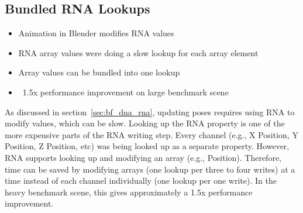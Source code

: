 \subsection{Bundled RNA Lookups}
\ifsummaries
\begin{itemize}
 \item Animation in Blender modifies RNA values
 \item RNA array values were doing a slow lookup for each array element
 \item Array values can be bundled into one lookup
 \item ~1.5x performance improvement on large benchmark scene
\end{itemize}
\fi

As discussed in section~\ref{sec:bf_dna_rna}, updating poses requires using RNA to modify values, which can be slow.
Looking up the RNA property is one of the more expensive parts of the RNA writing step.
Every channel (e.g., X Position, Y Position, Z Position, etc) was being looked up as a separate property.
However, RNA supports looking up and modifying an array (e.g., Position).
Therefore, time can be saved by modifying arrays (one lookup per three to four writes) at a time instead of each channel individually (one lookup per one write).
In the heavy benchmark scene, this gives approximately a 1.5x performance improvement.

